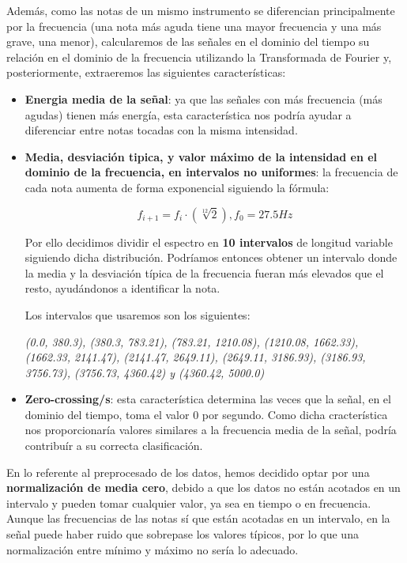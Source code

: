 \documentclass[12pt]{article}
\begin{document}
\bigskip
Además, como las notas de un mismo instrumento se diferencian principalmente por la frecuencia (una nota más aguda tiene una mayor frecuencia
y una más grave, una menor), calcularemos de las señales en el dominio del tiempo su relación en el dominio de la frecuencia utilizando la
Transformada de Fourier y, posteriormente, extraeremos las siguientes características:
\begin{itemize}
	\item \textbf{Energia media de la señal}: ya que las señales con más frecuencia (más agudas) tienen más energía, esta característica nos podría
		ayudar a diferenciar entre notas tocadas con la misma intensidad.
	\item \textbf{Media, desviación tipica, y valor máximo de la intensidad en el dominio de la frecuencia, en intervalos no uniformes}: la frecuencia de cada nota
		aumenta de forma exponencial siguiendo la fórmula:

		\begin{equation}
			f_{i+1} = f_{i}\cdot(\sqrt[12]{2}), f_0 = 27.5 Hz
		\end{equation}

		Por ello decidimos dividir el espectro en \textbf{10 intervalos} de longitud variable siguiendo dicha distribución. 
		Podríamos entonces obtener un intervalo donde la media y la desviación típica de la frecuencia fueran más elevados que el resto,
		ayudándonos a identificar la nota.
		
		Los intervalos que usaremos son los siguientes:
		
		\textit{(0.0, 380.3), (380.3, 783.21), (783.21, 1210.08), (1210.08, 1662.33),\newline
		(1662.33, 2141.47), (2141.47, 2649.11), (2649.11, 3186.93), (3186.93, 3756.73), 
		(3756.73, 4360.42) y (4360.42, 5000.0)}
	\item \textbf{Zero-crossing/s}: esta característica determina las veces que la señal, en el dominio del tiempo, toma el valor 0 por segundo.
		Como dicha cracterística nos proporcionaría valores similares a la frecuencia media de la señal, podría contribuír a su correcta clasificación.
\end{itemize}

\bigskip
En lo referente al preprocesado de los datos, hemos decidido optar por una \textbf{normalización de media cero},
debido a que los datos no están acotados en un intervalo y pueden tomar cualquier valor, ya sea
en tiempo o en frecuencia.
Aunque las frecuencias de las notas sí que están acotadas en un intervalo, en la señal
puede haber ruido que sobrepase los valores típicos, por lo que una normalización entre mínimo y máximo no sería lo adecuado.
\end{document}
